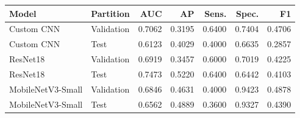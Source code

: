 \begin{tabular}{llrrrrr}
\toprule
Model & Partition & AUC & AP & Sens. & Spec. & F1 \\
\midrule
Custom CNN & Validation & 0.7062 & 0.3195 & 0.6400 & 0.7404 & 0.4706 \\
Custom CNN & Test & 0.6123 & 0.4029 & 0.4000 & 0.6635 & 0.2857 \\
ResNet18 & Validation & 0.6919 & 0.3457 & 0.6000 & 0.7019 & 0.4225 \\
ResNet18 & Test & 0.7473 & 0.5220 & 0.6400 & 0.6442 & 0.4103 \\
MobileNetV3-Small & Validation & 0.6846 & 0.4631 & 0.4000 & 0.9423 & 0.4878 \\
MobileNetV3-Small & Test & 0.6562 & 0.4889 & 0.3600 & 0.9327 & 0.4390 \\
\bottomrule
\end{tabular}
